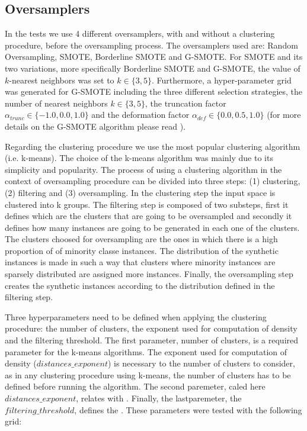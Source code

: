 \documentclass[parskip=full]{scrartcl}
\begin{document}
\subsection{Oversamplers}

In the tests we use 4 different oversamplers, with and without a clustering
procedure, before the oversampling process. The oversamplers used are: Random
Oversampling, SMOTE, Borderline SMOTE and G-SMOTE. For SMOTE and its two
variations, more specifically Borderline SMOTE and G-SMOTE, the value of
$k$-nearest neighbors was set to $k \in \{3, 5\}$. Furthermore, a
hyper-parameter grid was generated for G-SMOTE including the three different
selection strategies, the number of nearest neighbors $k \in \{3, 5\}$, the
truncation factor $\alpha_{trunc} \in \{-1.0, 0.0, 1.0\}$ and the deformation
factor $\alpha_{def} \in \{0.0, 0.5, 1.0\}$ (for more details on the G-SMOTE
algorithm please read \cite{Douzas2019}).

Regarding the clustering procedure we use the most popular clustering algorithm
(i.e. k-means). The choice of the k-means algorithm was mainly due to its
simplicity and popularity. The process of using a clustering algorithm in the
context of oversampling procedure can be divided into three steps: (1)
clustering, (2) filtering and (3) oversampling. In the clustering step the input
space is clustered into k groups. The filtering step is composed of two
substeps, first it defines which are the clusters that are going to be
oversampled and secondly it defines how many instances are going to be generated
in each one of the clusters. The clusters choosed for oversampling are the ones
in which there is a high proportion of of minority classe instances. The
distribution of the synthetic instances is made in such a way that clusters
where minority instances are sparsely distributed are assigned more instances.
Finally, the oversampling step creates the synthetic instances according to the
distribution defined in the filtering step.

Three hyperparameters need to be defined when applying the clustering procedure:
the number of clusters, the exponent used for computation of density and the
filtering threshold. The first parameter, number of clusters, is a required
parameter for the k-means algorithms. The exponent used for computation of
density ($distances\_exponent$) is necessary to the number of clusters to
consider, as in any clustering procedure using k-means, the number of clusters
has to be defined before running the algorithm. The second paremeter, caled here
$distances\_exponent$, relates with . Finally, the lastparemeter, the
$filtering\_threshold$, defines the . These parameters were tested with the
following grid:
\end{document}

